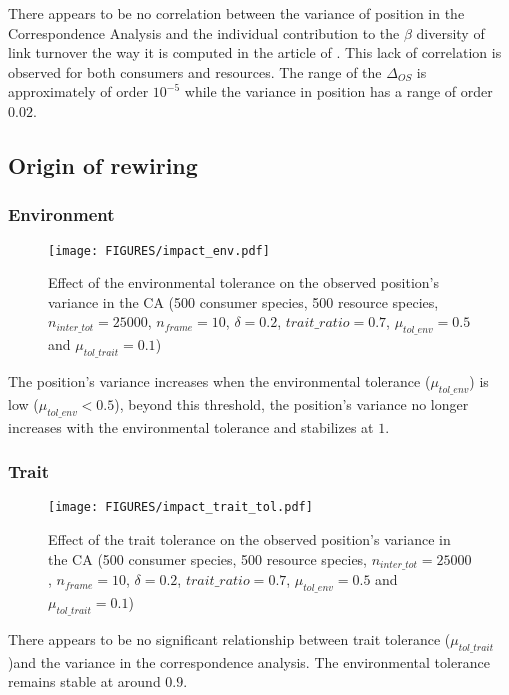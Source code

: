 There appears to be no correlation between the variance of position in the Correspondence Analysis and the individual contribution to the $\beta$ diversity of link turnover the way it is computed in the article of \citep{toju_interaction_2024}. This lack of correlation is observed for both consumers and resources. The range of the $\Delta_{OS}$ is approximately of order $10^{-5}$ while the variance in position has a range of order $0.02$.



\subsection{Origin of rewiring}

\subsubsection{Environment}

\begin{figure}[H]
    \centering
    \texttt{[image: FIGURES/impact\_env.pdf]}
    \caption{Effect of the environmental tolerance on the observed position's variance in the CA (500 consumer species, 500 resource species, $n_{inter\_tot} = 25000$, $n_{frame} = 10$, $\delta =  0.2$, $trait\_ratio = 0.7$, $\mu_{tol\_env} = 0.5$ and $\mu_{tol\_trait} = 0.1$)}
    \label{fig:effect_env}
\end{figure}

The position's variance increases when the environmental tolerance ($\mu_{tol\_env}$) is low ($\mu_{tol\_env} < 0.5$), beyond this threshold, the position's variance no longer increases with the environmental tolerance and stabilizes at $1$. 

\subsubsection{Trait}

\begin{figure}[H]
    \centering
    \texttt{[image: FIGURES/impact\_trait\_tol.pdf]}
    \caption{Effect of the trait tolerance on the observed position's variance in the CA (500 consumer species, 500 resource species, $n_{inter\_tot} = 25000$, $n_{frame} = 10$, $\delta =  0.2$, $trait\_ratio = 0.7$, $\mu_{tol\_env} = 0.5$ and $\mu_{tol\_trait} = 0.1$)}
    \label{fig:effect_trait}
\end{figure}

There appears to be no significant relationship between trait tolerance ($\mu_{tol\_trait}$)and the variance in the correspondence analysis. The environmental tolerance remains stable at around $0.9$.